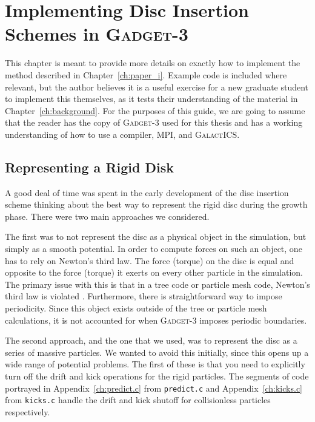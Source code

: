 

\chapter{Implementing Disc Insertion Schemes in \textsc{Gadget-3}}\label{ch:implementation}

This chapter is meant to provide more details on exactly how to implement the method described in Chapter~\ref{ch:paper_i}. Example code is included where relevant, but the author believes it is a useful exercise for a new graduate student to implement this themselves, as it tests their understanding of the material in Chapter~\ref{ch:background}. For the purposes of this guide, we are going to assume that the reader has the copy of \textsc{Gadget-3} used for this thesis and has a working understanding of how to use a compiler, MPI, and \textsc{GalactICS}.

\section{Representing a Rigid Disk}

A good deal of time was spent in the early development of the disc insertion scheme thinking about the best way to represent the rigid disc during the growth phase. There were two main approaches we considered. 

The first was to not represent the disc as a physical object in the simulation, but simply as a smooth potential.  In order to compute forces on such an object, one has to rely on Newton's third law. The force (torque) on the disc is equal and opposite to the force (torque) it exerts on every other particle in the simulation. The primary issue with this is that in a tree code or particle mesh code, Newton's third law is violated \citep{barnes_hut, hernquist_1991, GadgetCodePaper}. Furthermore, there is straightforward way to impose periodicity. Since this object exists outside of the tree or particle mesh calculations, it is not accounted for when \textsc{Gadget-3} imposes periodic boundaries.

The second approach, and the one that we used, was to represent the disc as a series of massive particles. We wanted to avoid this initially, since this opens up a wide range of potential problems. The first of these is that you need to explicitly turn off the drift and kick operations for the rigid particles. The segments of code portrayed in Appendix~\ref{ch:predict.c} from \texttt{predict.c} and Appendix~\ref{ch:kicks.c} from \texttt{kicks.c} handle the drift and kick shutoff for collisionless particles respectively. 

